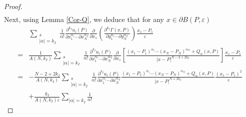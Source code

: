 \documentclass[11pt,reqno]{article}
\numberwithin{equation}{section}
\newcommand\e\varepsilon
\begin{document}
\begin{proof}
\begin{equation}
\begin{aligned}
        \end{aligned}
    \end{equation}
   Next, using Lemma \ref{Cor-Q}, we deduce that for any $x\in \partial B(P,\e)$
        \begin{align*}
          &  \sum_{\substack{s\\|\alpha|={ k_I}}}\frac1{\alpha!}
					\frac{\partial^{{ k_I}}u_i(P)}{\partial x_1^{\alpha_1}\cdots\partial x_N^{\alpha_N}}\frac{\partial}{\partial x_s}\left(\frac{\partial^{{ k_I}}\Gamma(x,P)}{\partial y_1^{\alpha_1}\cdots\partial y_N^{\alpha_N}}\right)\frac{x_s-P_s}{\e}
                    \\
                    =&\frac{1}{A(N,{ k_I})}\sum_{\substack{s\\|\alpha|={ k_I}}}\frac1{\alpha!}
					\frac{\partial^{{ k_I}}u_i(P)}{\partial x_1^{\alpha_1}\cdots\partial x_N^{\alpha_N}}\frac{\partial}{\partial x_s}
                    \left[\frac{(x_1-P_1)^{\alpha_1}\cdots (x_N-P_N)^{\alpha_N}+Q_\alpha(x,P)}
					{|x-P|^{N-2+2{ k_I}}}\right]\frac{x_s-P_s}{\e}\\
                  =&-\frac{N-2+2{ k_I}}{A(N,{ k_I})}\sum_{\substack{s\\|\alpha|={ k_I}}}\frac1{\alpha!}
					\frac{\partial^{{ k_I}}u_i(P)}{\partial x_1^{\alpha_1}\cdots\partial x_N^{\alpha_N}}\frac{(x_1-P_1)^{\alpha_1}\cdots (x_N-P_N)^{\alpha_N}+Q_\alpha(x,P)}{|x-P|^{N+2{ k_I}}}\frac{(x_s-P_s)^2}{\e}\\
                  &+\frac{k_I}{A(N,{ k_I})\e}\sum_{|\alpha|={ k_I}}\frac1{\alpha!}

\end{align*}
\end{proof}
\end{document}
